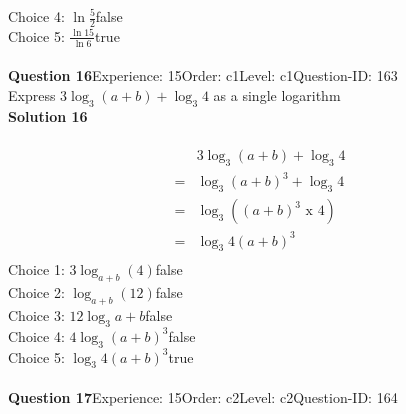\documentclass{article}
\begin{document}
Choice 4: \hspace{20pt}$\ln{\displaystyle\frac{5}{2}}$\hspace{20pt}false\\
Choice 5: \hspace{20pt}$\displaystyle\frac{\ln15}{\ln6}$\hspace{20pt}true\\
\\[4pt]
\noindent\textbf{Question 16}\hspace{20pt}Experience: 15\hspace{20pt}Order: c1\hspace{20pt}Level: c1\hspace{20pt}Question-ID: 163\\[2pt]
Express $3\log_{3}(a+b)+\log_{3}4$ as a single logarithm\\[4pt]
\noindent\textbf{Solution 16}\\[2pt]
\\[-35pt]\begin{align*}
&3\log_{3}(a+b)+\log_{3}4\\[2pt]
=&\log_{3}(a+b)^3+\log_{3}4\\[2pt]
=&\log_{3}((a+b)^3 \,\, \text{x} \,\, 4)\\[2pt]
=&\log_{3}4(a+b)^3\\[-80pt]
\end{align*}
Choice 1: \hspace{20pt}$3\log_{a+b}(4)$\hspace{20pt}false\\
Choice 2: \hspace{20pt}$\log_{a+b}(12)$\hspace{20pt}false\\
Choice 3: \hspace{20pt}$12\log_{3}a+b$\hspace{20pt}false\\
Choice 4: \hspace{20pt}$4\log_{3}(a+b)^3$\hspace{20pt}false\\
Choice 5: \hspace{20pt}$\log_{3}4(a+b)^3$\hspace{20pt}true\\
\\[4pt]
\noindent\textbf{Question 17}\hspace{20pt}Experience: 15\hspace{20pt}Order: c2\hspace{20pt}Level: c2\hspace{20pt}Question-ID: 164\\[2pt]
\end{document}
